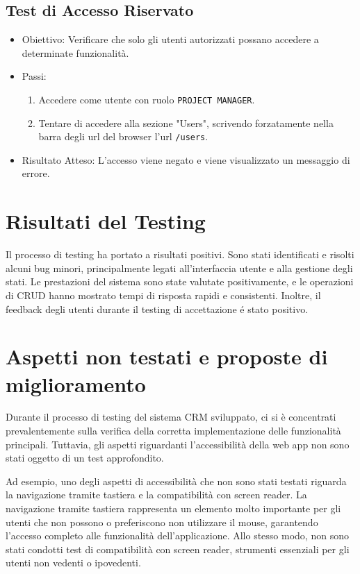 \documentclass[target=bach,aauheader=,style=]{thud}
\begin{document}
\subsection{Test di Accesso Riservato}
\begin{itemize}
    \item Obiettivo: Verificare che solo gli utenti autorizzati possano accedere a determinate funzionalità.
    \item Passi:
    \begin{enumerate}
        \item Accedere come utente con ruolo \texttt{PROJECT MANAGER}.
        \item Tentare di accedere alla sezione "Users", scrivendo forzatamente nella barra degli url del browser l'url \texttt{/users}.
    \end{enumerate}
    \item Risultato Atteso: L'accesso viene negato e viene visualizzato un messaggio di errore.
\end{itemize}

\section{Risultati del Testing}
Il processo di testing ha portato a risultati positivi. Sono stati identificati e risolti alcuni bug minori, principalmente legati all'interfaccia utente e alla gestione degli stati. Le prestazioni del sistema sono state valutate positivamente, e le operazioni di CRUD hanno mostrato tempi di risposta rapidi e consistenti. Inoltre, il feedback degli utenti durante il testing di accettazione é stato positivo.

\section{Aspetti non testati e proposte di miglioramento}
Durante il processo di testing del sistema CRM sviluppato, ci si è concentrati prevalentemente sulla verifica della corretta implementazione delle funzionalità principali. Tuttavia, gli aspetti riguardanti l'accessibilità della web app non sono stati oggetto di un test approfondito. 

\noindent Ad esempio, uno degli aspetti di accessibilità che non sono stati testati riguarda la navigazione tramite tastiera e la compatibilità con screen reader. La navigazione tramite tastiera rappresenta un elemento molto importante per gli utenti che non possono o preferiscono non utilizzare il mouse, garantendo l'accesso completo alle funzionalità dell'applicazione. Allo stesso modo, non sono stati condotti test di compatibilità con screen reader, strumenti essenziali per gli utenti non vedenti o ipovedenti.
\end{document}
